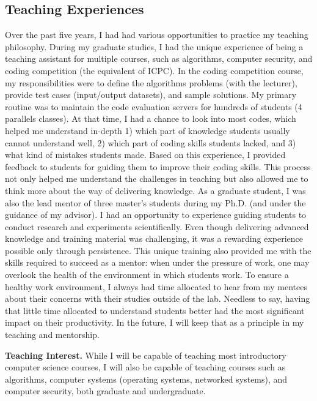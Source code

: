 \documentclass{NSF}
\newcommand{\BfPara}[1]{{\noindent\textbf{#1.}}\xspace}
\begin{document}
\vspace{-3mm}
\subsection*{Teaching Experiences}
Over the past five years, I had had various opportunities to practice my teaching philosophy. During my graduate studies, I had the unique experience of being a teaching assistant for multiple courses, such as algorithms, computer security, and coding competition (the equivalent of ICPC). In the coding competition course, my responsibilities were to define the algorithms problems (with the lecturer), provide test cases (input/output datasets), and sample solutions. My primary routine was to maintain the code evaluation servers for hundreds of students (4 parallels classes). At that time, I had a chance to look into most codes, which helped me understand in-depth  1) which part of knowledge students usually cannot understand well, 2) which part of coding skills students lacked, and 3) what kind of mistakes students made. Based on this experience, I provided feedback to students for guiding them to improve their coding skills. This process not only helped me understand the challenges in teaching but also allowed me to think more about the way of delivering knowledge. As a graduate student, I was also the lead mentor of three master's students during my Ph.D. (and under the guidance of my advisor). I had an opportunity to experience guiding students to conduct research and experiments scientifically. Even though delivering advanced knowledge and training material was challenging, it was a rewarding experience possible only through persistence. This unique training also provided me with the skills required to succeed as a mentor: when under the pressure of work, one may overlook the health of the environment in which students work. To ensure a healthy work environment, I always had time allocated to hear from my mentees about their concerns with their studies outside of the lab. Needless to say, having that little time allocated to understand students better had the most significant impact on their productivity. In the future, I will keep that as a principle in my teaching and mentorship. 

\BfPara{Teaching Interest} While I will be capable of teaching most introductory computer science courses, I will also be capable of teaching courses such as algorithms, computer systems (operating systems, networked systems), and computer security, both graduate and undergraduate. 

\end{document}
